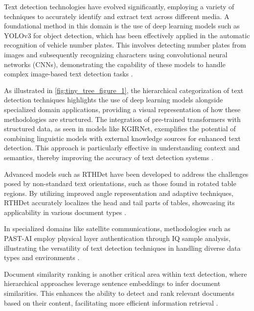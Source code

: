 

Text detection technologies have evolved significantly, employing a variety of techniques to accurately identify and extract text across different media. A foundational method in this domain is the use of deep learning models such as YOLOv3 for object detection, which has been effectively applied in the automatic recognition of vehicle number plates. This involves detecting number plates from images and subsequently recognizing characters using convolutional neural networks (CNNs), demonstrating the capability of these models to handle complex image-based text detection tasks \cite{adak2022automaticnumberplaterecognition}.

As illustrated in \autoref{fig:tiny_tree_figure_1}, the hierarchical categorization of text detection techniques highlights the use of deep learning models alongside specialized domain applications, providing a visual representation of how these methodologies are structured. The integration of pre-trained transformers with structured data, as seen in models like KGIRNet, exemplifies the potential of combining linguistic models with external knowledge sources for enhanced text detection. This approach is particularly effective in understanding context and semantics, thereby improving the accuracy of text detection systems \cite{chaudhuri2021groundingdialoguesystemsknowledge}.

Advanced models such as RTHDet have been developed to address the challenges posed by non-standard text orientations, such as those found in rotated table regions. By utilizing improved angle representation and adaptive techniques, RTHDet accurately localizes the head and tail parts of tables, showcasing its applicability in various document types \cite{hu2023rthdetrotatetablearea}.

In specialized domains like satellite communications, methodologies such as PAST-AI employ physical layer authentication through IQ sample analysis, illustrating the versatility of text detection techniques in handling diverse data types and environments \cite{oligeri2020pastaiphysicallayerauthenticationsatellite}.

Document similarity ranking is another critical area within text detection, where hierarchical approaches leverage sentence embeddings to infer document similarities. This enhances the ability to detect and rank relevant documents based on their content, facilitating more efficient information retrieval \cite{ginzburg2021selfsuperviseddocumentsimilarityranking}.

